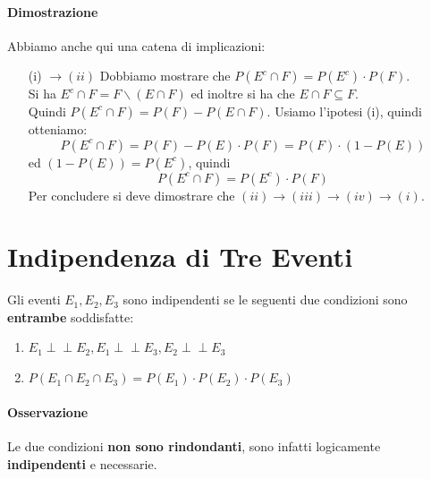 \documentclass{report}
\newcommand{\indep}{\perp \!\!\! \perp}
\begin{document}
\paragraph{Dimostrazione} Abbiamo anche qui una catena di implicazioni: \begin{itemize}
    \item [(i) \(\xrightarrow{} (ii)\)] Dobbiamo mostrare che \(P(E^c \cap F) = P(E^c) \cdot P(F)\). \\
    Si ha \(E^c \cap F = F \backslash (E \cap F)\) ed inoltre si ha che \(E \cap F \subseteq F\).\\
    Quindi \(P(E^c \cap F) = P(F) - P(E \cap F)\). Usiamo l'ipotesi (i), quindi otteniamo: \[P(E^c \cap F) = P(F) - P(E) \cdot P(F) = P(F)\cdot (1-P(E))\] ed \((1-P(E)) = P(E^c)\), quindi \[P(E^c \cap F) = P(E^c)\cdot P(F)\]
    Per concludere si deve dimostrare che \((ii) \xrightarrow{}(iii)\xrightarrow{}(iv)\xrightarrow{}(i)\).
\end{itemize}
\section{Indipendenza di Tre Eventi}
Gli eventi \(E_1, E_2, E_3\) sono indipendenti se le seguenti due condizioni sono \textbf{entrambe} soddisfatte: \begin{enumerate}
    \item \(E_1 \indep E_2, E_1 \indep E_3, E_2 \indep E_3\)
    \item \(P(E_1 \cap E_2 \cap E_3) = P(E_1)\cdot P(E_2) \cdot P(E_3)\)
\end{enumerate}
\paragraph{Osservazione} Le due condizioni \textbf{non sono rindondanti}, sono infatti logicamente \textbf{indipendenti} e necessarie.
\end{document}
